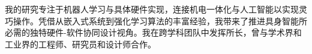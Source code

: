 
\vspace{-8mm}

\begin{cvparagraph}
我的研究专注于机器人学习与具体硬件实现，连接机电一体化与人工智能以实现灵巧操作。凭借从嵌入式系统到强化学习算法的丰富经验，我带来了推进具身智能所必需的独特硬件-软件协同设计视角。我在跨学科团队中发挥所长，曾与学术界和工业界的工程师、研究员和设计师合作。

\vspace{-5mm}
\end{cvparagraph}
